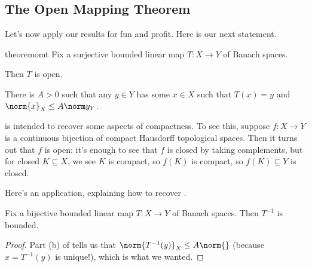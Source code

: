 \documentclass[../notes.tex]{subfiles}
\begin{document}
\subsection{The Open Mapping Theorem}
Let's now apply our results for fun and profit. Here is our next statement.
\begin{restatable}{theorem}{omt} \label{thm:open-map}
	Fix a surjective bounded linear map $T\colon X\to Y$ of Banach spaces.
	\begin{listalph}
		\item Then $T$ is open.
		\item There is $A>0$ such that any $y\in Y$ has some $x\in X$ such that $T(x)=y$ and $\norm{x}_X\le A\norm y_Y$.
	\end{listalph}
\end{restatable}
\begin{remark} \label{rem:continuous-bijection}
	 is intended to recover some aspects of compactness. To see this, suppose $f\colon X\to Y$ is a continuous bijection of compact Hausdorff topological spaces. Then it turns out that $f$ is open: it's enough to see that $f$ is closed by taking complements, but for closed $K\subseteq X$, we see $K$ is compact, so $f(K)$ is compact, so $f(K)\subseteq Y$ is closed.
\end{remark}
Here's an application, explaining how to recover .
\begin{corollary} \label{cor:bounded-linear-bijection}
	Fix a bijective bounded linear map $T\colon X\to Y$ of Banach spaces. Then $T^{-1}$ is bounded.
\end{corollary}
\begin{proof}
	Part (b) of  tells us that $\norm{T^{-1}(y)}_X\le A\norm{}$ (because $x=T^{-1}(y)$ is unique!), which is what we wanted.
\end{proof}
\end{document}
